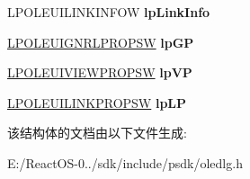 \begin{DoxyCompactItemize}
L\+P\+O\+L\+E\+U\+I\+L\+I\+N\+K\+I\+N\+F\+OW {\bfseries lp\+Link\+Info}
\item 
\mbox{\label{structtag_o_l_e_u_i_o_b_j_e_c_t_p_r_o_p_s_w_ab2458cdc15466a15fd13a9f41d40dc75}} 
\hyperlink{structtag_o_l_e_u_i_g_n_r_l_p_r_o_p_s_w}{L\+P\+O\+L\+E\+U\+I\+G\+N\+R\+L\+P\+R\+O\+P\+SW} {\bfseries lp\+GP}
\item 
\mbox{\label{structtag_o_l_e_u_i_o_b_j_e_c_t_p_r_o_p_s_w_a0e932d05914d947b63e8522100f6f120}} 
\hyperlink{structtag_o_l_e_u_i_v_i_e_w_p_r_o_p_s_w}{L\+P\+O\+L\+E\+U\+I\+V\+I\+E\+W\+P\+R\+O\+P\+SW} {\bfseries lp\+VP}
\item 
\mbox{\label{structtag_o_l_e_u_i_o_b_j_e_c_t_p_r_o_p_s_w_aaad5cae8df72366705cb64c64b32fb74}} 
\hyperlink{structtag_o_l_e_u_i_l_i_n_k_p_r_o_p_s_w}{L\+P\+O\+L\+E\+U\+I\+L\+I\+N\+K\+P\+R\+O\+P\+SW} {\bfseries lp\+LP}
\end{DoxyCompactItemize}


该结构体的文档由以下文件生成\+:\begin{DoxyCompactItemize}
\item 
E\+:/\+React\+O\+S-\/0../sdk/include/psdk/oledlg.\+h\end{DoxyCompactItemize}
